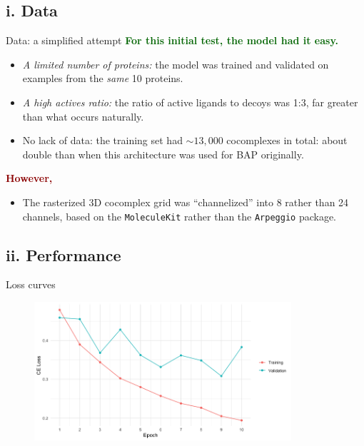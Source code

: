 \documentclass[aspectratio=169,xcolor=dvipsnames]{beamer}
\begin{document}
\subsection{i. Data}
\begin{frame}{Data: a simplified attempt}
    \textcolor{darkgreen}{\textbf{For this initial test, the model had it 
    easy.}}
    \begin{itemize}
        \item \textit{A limited number of proteins:} the model was trained and validated on examples from the \textit{same} 10 proteins.
        \item \textit{A high actives ratio:} the ratio of active ligands to decoys was 1:3, far greater than what occurs naturally.
        \item {No lack of data:} the training set had $\sim13,000$ cocomplexes in total: about double than when this architecture was used for BAP originally.
    \end{itemize}
    \textcolor{darkred}{\textbf{However,}}
    \begin{itemize}
        \item The rasterized 3D cocomplex grid was ``channelized'' into 8 rather than 24 channels, based on the \texttt{MoleculeKit} rather than the \texttt{Arpeggio} package.
    \end{itemize}
\end{frame}


\subsection{ii. Performance}
\begin{frame}{Loss curves}
    \begin{figure}
        \centering
        \includegraphics[width=0.85\textwidth]{images/loss_curves}
    \end{figure}
\end{frame}
\end{document}
